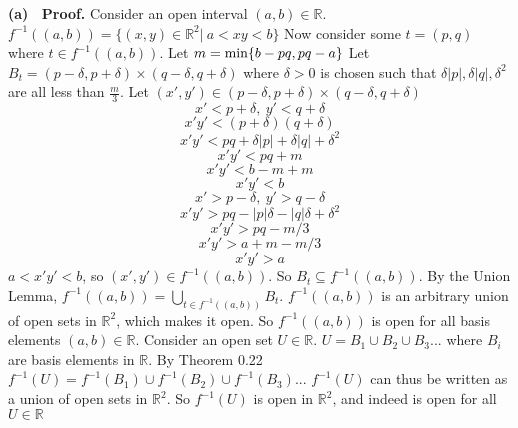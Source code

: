 \documentclass[12pt]{article}
\begin{document}
  \textbf{(a) \ Proof.}
  Consider an open interval \((a,b) \in \mathbb{R}\).
  \newline
  \(f^{-1}((a,b)) = \{(x,y) \in \mathbb{R}^2|\ a < xy < b\}\)
  \newline
  Now consider some \(t = (p,q)\) where \(t \in f^{-1}((a,b))\).
  \newline
  Let \(m = \textup{min}\{b-pq,pq-a\}\)
  \newline
  Let \(B_t = (p - \delta, p + \delta) \times (q - \delta, q + \delta)\)
  \newline
  where \(\delta > 0\) is chosen such that \(\delta|p|, \delta|q|, \delta^2\) are all less than \(\frac{m}{3}\).
  \newline
  \newline
  Let \((x',y') \in (p-\delta,p+\delta) \times (q-\delta, q+\delta)\)
  \newline
  \[x' < p + \delta,\ y' < q + \delta\]
  \[x'y' < (p + \delta)(q + \delta)\]
  \[x'y' < pq + \delta|p|+ \delta|q| + \delta^2\]
  \[x'y' < pq + m\]
  \[x'y' < b - m + m\]
  \[x'y' < b\]
  \newline
  \[x' > p - \delta,\ y' > q - \delta\]
  \[x'y' > pq -|p|\delta -|q|\delta +\delta^2\]
  \[x'y' > pq - m/3\]
  \[x'y' > a + m - m/3\]
  \[x'y' > a\]
  \(a < x'y' < b\), so \((x',y') \in f^{-1}((a,b))\).
  \newline
  So \(B_t \subseteq f^{-1}((a,b))\).
  \newline
  \newline
  By the Union Lemma, \(f^{-1}((a,b)) = \bigcup_{t \in f^{-1}((a,b))}B_t\).
  \newline
  \(f^{-1}((a,b))\) is an arbitrary union of open sets in \(\mathbb{R}^2\), which makes it open.
  \newline
  So \(f^{-1}((a,b))\) is open for all basis elements \((a,b) \in \mathbb{R}\).
  \newline \newline
  Consider an open set \(U \in \mathbb{R}\).
  \newline
  \(U = B_1 \cup B_2 \cup B_3...\) where \(B_i\) are basis elements in \(\mathbb{R}\).
  \newline
  By Theorem 0.22 \(f^{-1}(U) = f^{-1}(B_1) \cup f^{-1}(B_2) \cup f^{-1}(B_3)...\)
  \newline \newline
  \(f^{-1}(U)\) can thus be written as a union of open sets in \(\mathbb{R}^2\).
  \newline
  So \(f^{-1}(U)\) is open in \(\mathbb{R}^2\), and indeed is open for all \(U \in \mathbb{R}\)
\end{document}

